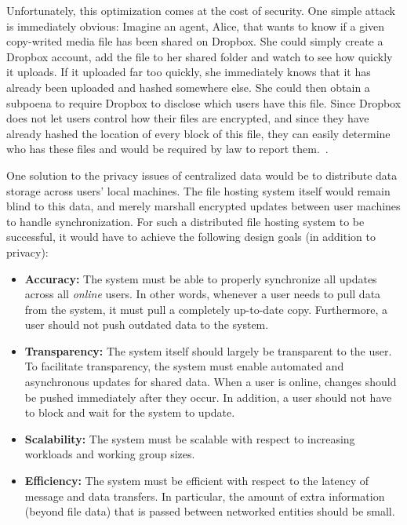 Unfortunately, this optimization comes at the cost of security. One simple attack is immediately obvious: 
Imagine an agent, Alice, that wants to know if a given copy-writed media file has been shared on Dropbox.
She could simply create a Dropbox account, add the file to her shared folder and watch to see how quickly it uploads. 
If it uploaded far too quickly, she immediately knows that it has already been uploaded and hashed somewhere else.
She could then obtain a subpoena to require Dropbox to disclose which users have this file. Since Dropbox does not 
let users control how their files are encrypted, and since they have already hashed the location of every block of this file,
they can easily determine who has these files and would be required by law to report them.~\cite{dropboxprivacy}.

One solution to the privacy issues of centralized data would be to distribute
data storage across users' local machines.
The file hosting system itself would remain blind to this data, 
and merely marshall encrypted updates between user machines to handle synchronization.
For such a distributed file hosting system to be successful, it would have to achieve
the following design goals (in addition to privacy):
\begin{itemize}
    \item \textbf{Accuracy:} The system must be able to properly synchronize all updates across all \emph{online} users. In other words, whenever a user needs to pull
    data from the system, it must pull a completely up-to-date copy.  Furthermore, a user should not push outdated data to the system.
    \item \textbf{Transparency:} The system itself should largely be transparent to the user. 
    To facilitate transparency, the system must enable automated and asynchronous updates for shared data. When a user is online,
    changes should be pushed immediately after they occur. In addition, a user should not have to block and wait for the system to update.
    \item \textbf{Scalability:} The system must be scalable with respect to increasing workloads and working group sizes.
    \item \textbf{Efficiency:} The system must be efficient with respect to the latency of message and data transfers.
    In particular, the amount of extra information (beyond file data) 
    that is passed between networked entities should be small.
\end{itemize}

